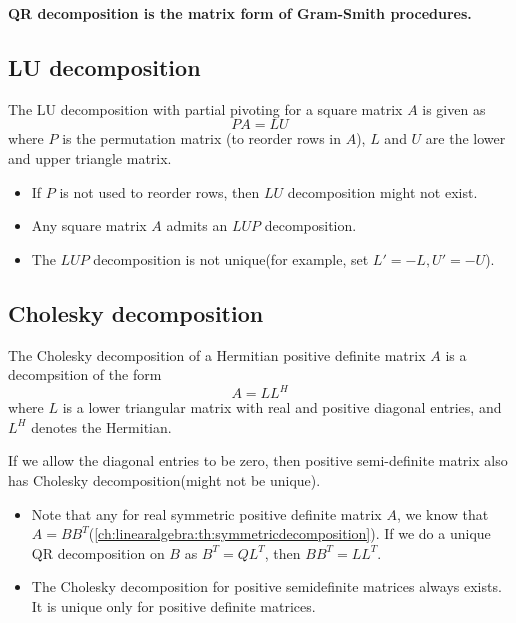 \begin{refsection}
\begin{remark}
\textbf{QR decomposition is the matrix form of Gram-Smith procedures.} 
\end{remark}


\subsection{LU decomposition}
\begin{definition}
The LU decomposition with partial pivoting for a square matrix $A$ is given as
$$PA = LU$$
where $P$ is the permutation matrix (to reorder rows in $A$), $L$ and $U$ are the lower and upper triangle matrix. 
\end{definition}

\begin{remark}\hfill
	\begin{itemize}
		\item If $P$ is not used to reorder rows, then $LU$ decomposition might not exist.
		\item Any square matrix $A$ admits an $LUP$ decomposition.
		\item The $LUP$ decomposition is not unique(for example, set $L' = -L, U' = -U$).
	\end{itemize}
\end{remark}

\subsection{Cholesky decomposition}
\begin{definition}
The Cholesky decomposition of a Hermitian positive definite matrix $A$ is a decompsition of the form
$$A = LL^H$$
where $L$ is a lower triangular matrix with real and positive diagonal entries, and $L^H$ denotes the Hermitian.
\end{definition}

\begin{remark}
If we allow the diagonal entries to be zero, then positive semi-definite matrix also has Cholesky decomposition(might not be unique).
\end{remark}

\begin{remark}\hfill
	\begin{itemize}
		\item Note that any for real symmetric positive definite matrix $A$, we know that $A = BB^T$(\autoref{ch:linearalgebra:th:symmetricdecomposition}). If we do a unique QR decomposition on $B$ as $B^T = QL^T$, then $BB^T = LL^T$.
		\item The Cholesky decomposition for positive semidefinite matrices always exists. It is unique only for positive definite matrices. 
	\end{itemize}
\end{remark}



\end{refsection}
